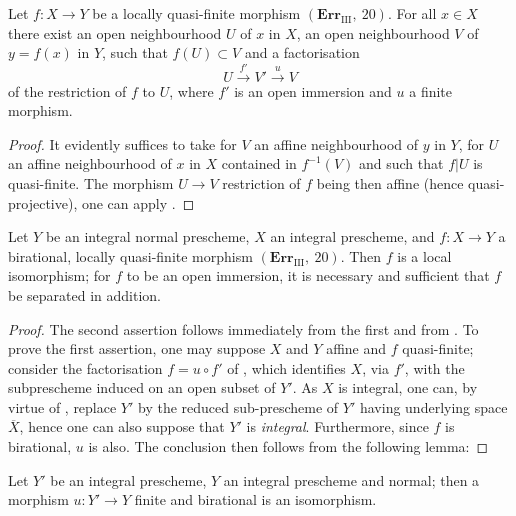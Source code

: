 
\begin{corollary}[8.12.9]
\label{IV.8.12.9}
Let $f:X\to Y$ be a locally quasi-finite morphism $(\mathbf{Err}_{\text{III}},~20)$.
For all $x\in X$ there exist an open neighbourhood $U$ of $x$ in $X$, an open neighbourhood $V$ of $y=f(x)$ in $Y$, such that $f(U)\subset V$ and a factorisation
\[
U\xrightarrow{f'}V'\xrightarrow{u}V
\]
of the restriction of $f$ to $U$, where $f'$ is an open immersion and $u$ a finite morphism.
\end{corollary}

\begin{proof}
It evidently suffices to take for $V$ an affine neighbourhood of $y$ in $Y$, for $U$ an affine neighbourhood of $x$ in $X$ contained in $f^{-1}(V)$ and such that $f|U$ is quasi-finite.
The morphism $U\to V$ restriction of $f$ being then affine (hence quasi-projective), one can apply .
\end{proof}

\begin{corollary}[8.12.10]
\label{IV.8.12.10}
Let $Y$ be an integral normal prescheme, $X$ an integral prescheme, and $f:X\to Y$ a birational, locally quasi-finite morphism $(\mathbf{Err}_{\text{III}},~20)$.
Then $f$ is a local isomorphism; for $f$ to be an open immersion, it is necessary and sufficient that $f$ be separated in addition.
\end{corollary}

\begin{proof}
The second assertion follows immediately from the first and from .
To prove the first assertion, one may suppose $X$ and $Y$ affine and $f$ quasi-finite; consider the factorisation $f=u\circ f'$ of , which identifies $X$, via $f'$, with the subprescheme induced on an open subset of $Y'$.
As $X$ is integral, one can, by virtue of , replace $Y'$ by the reduced sub-prescheme of $Y'$ having underlying space $\overline{X}$, hence one can also suppose that $Y'$ is \emph{integral}.
Furthermore, since $f$ is birational, $u$ is also.
The conclusion then follows from the following lemma:
\end{proof}

\begin{lemma}[8.12.10.1]
\label{IV.8.12.10.1}
Let $Y'$ be an integral prescheme, $Y$ an integral prescheme and normal; then a morphism $u:Y'\to Y$ finite and birational is an isomorphism.
\end{lemma}

